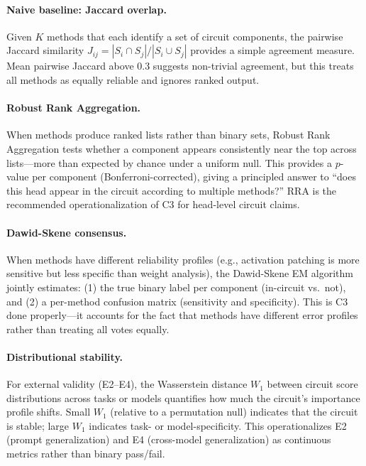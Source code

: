 \documentclass{article}
\begin{document}
\paragraph{Naive baseline: Jaccard overlap.} Given $K$ methods that each identify a set of circuit components, the pairwise Jaccard similarity $J_{ij} = |S_i \cap S_j| / |S_i \cup S_j|$ provides a simple agreement measure. Mean pairwise Jaccard above 0.3 suggests non-trivial agreement, but this treats all methods as equally reliable and ignores ranked output.

\paragraph{Robust Rank Aggregation.} When methods produce ranked lists rather than binary sets, Robust Rank Aggregation \citep{kolde2012robust} tests whether a component appears consistently near the top across lists---more than expected by chance under a uniform null. This provides a $p$-value per component (Bonferroni-corrected), giving a principled answer to ``does this head appear in the circuit according to multiple methods?'' RRA is the recommended operationalization of C3 for head-level circuit claims.

\paragraph{Dawid-Skene consensus.} When methods have different reliability profiles (e.g., activation patching is more sensitive but less specific than weight analysis), the Dawid-Skene EM algorithm \citep{dawid1979maximum} jointly estimates: (1) the true binary label per component (in-circuit vs.\ not), and (2) a per-method confusion matrix (sensitivity and specificity). This is C3 done properly---it accounts for the fact that methods have different error profiles rather than treating all votes equally.

\paragraph{Distributional stability.} For external validity (E2--E4), the Wasserstein distance $W_1$ between circuit score distributions across tasks or models quantifies how much the circuit's importance profile shifts. Small $W_1$ (relative to a permutation null) indicates that the circuit is stable; large $W_1$ indicates task- or model-specificity. This operationalizes E2 (prompt generalization) and E4 (cross-model generalization) as continuous metrics rather than binary pass/fail.
\end{document}
